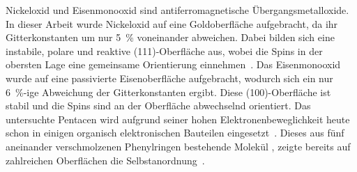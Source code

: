     Nickeloxid und Eisenmonooxid sind antiferromagnetische Übergangsmetalloxide.
    In dieser Arbeit wurde Nickeloxid auf eine Goldoberfläche aufgebracht, da ihr Gitterkonstanten um nur \SI{5}{\percent} voneinander abweichen.
    Dabei bilden sich eine instabile, polare und reaktive (111)-Oberfläche aus, wobei die Spins in der obersten Lage eine gemeinsame Orientierung einnehmen~\cite{cappus_hydroxyl_1993}.
    Das Eisenmonooxid wurde auf eine passivierte Eisenoberfläche aufgebracht, wodurch sich ein nur \SI{6}{\percent}-ige Abweichung der Gitterkonstanten ergibt.
    Diese (100)-Oberfläche ist stabil und die Spins sind an der Oberfläche abwechselnd orientiert.
    Das untersuchte Pentacen wird aufgrund seiner hohen Elektronenbeweglichkeit heute schon in einigen organisch elektronischen Bauteilen eingesetzt~\cite{5A_4, 5A_13}.
    Dieses aus fünf aneinander verschmolzenen Phenylringen bestehende Molekül \cite{MM_2}, zeigte bereits auf zahlreichen Oberflächen die Selbstanordnung~\cite{5A_4, 5A_1, 5A_6, 5A_10, 5A_5, 5A_9}.
    


